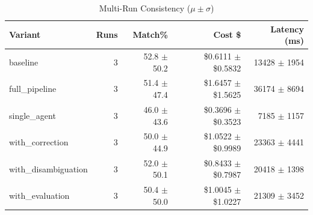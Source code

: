 \begin{table}[htbp]
\centering
\caption{Multi-Run Consistency ($\mu \pm \sigma$)}
\label{tab:consistency}
\begin{tabular}{l r rrr}
\toprule
Variant & Runs & Match\% & Cost \$ & Latency (ms) \\
\midrule
  baseline & 3 & 52.8 $\pm$ 50.2 & \$0.6111 $\pm$ \$0.5832 & 13428 $\pm$ 1954 \\
  full\_pipeline & 3 & 51.4 $\pm$ 47.4 & \$1.6457 $\pm$ \$1.5625 & 36174 $\pm$ 8694 \\
  single\_agent & 3 & 46.0 $\pm$ 43.6 & \$0.3696 $\pm$ \$0.3523 & 7185 $\pm$ 1157 \\
  with\_correction & 3 & 50.0 $\pm$ 44.9 & \$1.0522 $\pm$ \$0.9989 & 23363 $\pm$ 4441 \\
  with\_disambiguation & 3 & 52.0 $\pm$ 50.1 & \$0.8433 $\pm$ \$0.7987 & 20418 $\pm$ 1398 \\
  with\_evaluation & 3 & 50.4 $\pm$ 50.0 & \$1.0045 $\pm$ \$1.0227 & 21309 $\pm$ 3452 \\
\bottomrule
\end{tabular}
\end{table}
